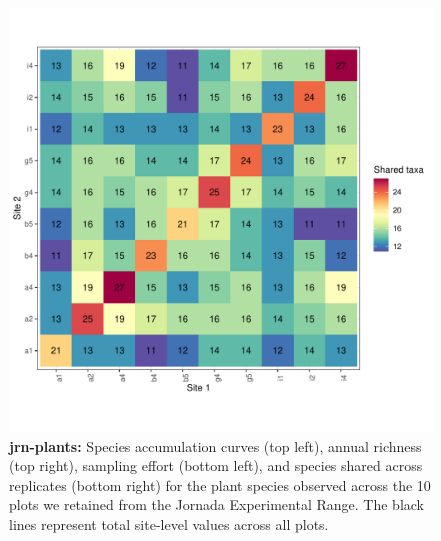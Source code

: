 \documentclass[11pt, oneside]{article}
\begin{document}
\begin{figure}[h!]
\includegraphics[scale = 0.4]{jrn-plants-compagnoni_spp_shared.pdf}
\caption{{\bf jrn-plants:} Species accumulation curves (top left),  annual richness (top right), sampling effort (bottom left), and species shared across replicates (bottom right) for the plant species observed across the 10 plots we retained from the Jornada Experimental Range. The black lines represent total site-level values across all plots.}
\label{jrn-plants}
\end{figure}
\end{document}
